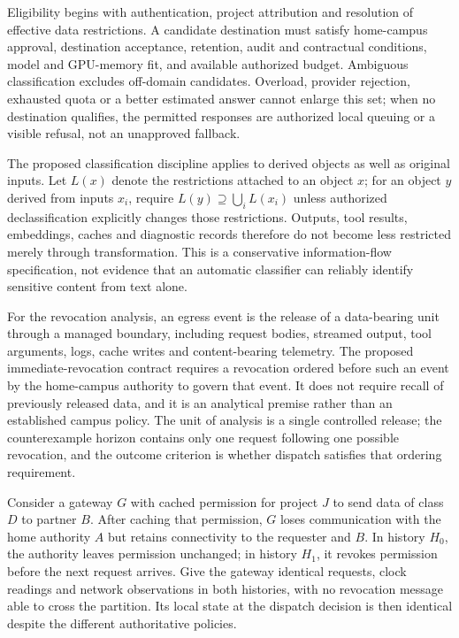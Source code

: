 \documentclass[11pt]{article}
\begin{document}
Eligibility begins with authentication, project attribution and resolution of effective data restrictions. A candidate destination must satisfy home-campus approval, destination acceptance, retention, audit and contractual conditions, model and GPU-memory fit, and available authorized budget. Ambiguous classification excludes off-domain candidates. Overload, provider rejection, exhausted quota or a better estimated answer cannot enlarge this set; when no destination qualifies, the permitted responses are authorized local queuing or a visible refusal, not an unapproved fallback.

The proposed classification discipline applies to derived objects as well as original inputs. Let $L(x)$ denote the restrictions attached to an object $x$; for an object $y$ derived from inputs $x_i$, require $L(y) \supseteq \bigcup_i L(x_i)$ unless authorized declassification explicitly changes those restrictions. Outputs, tool results, embeddings, caches and diagnostic records therefore do not become less restricted merely through transformation. This is a conservative information-flow specification, not evidence that an automatic classifier can reliably identify sensitive content from text alone.

For the revocation analysis, an egress event is the release of a data-bearing unit through a managed boundary, including request bodies, streamed output, tool arguments, logs, cache writes and content-bearing telemetry. The proposed immediate-revocation contract requires a revocation ordered before such an event by the home-campus authority to govern that event. It does not require recall of previously released data, and it is an analytical premise rather than an established campus policy. The unit of analysis is a single controlled release; the counterexample horizon contains only one request following one possible revocation, and the outcome criterion is whether dispatch satisfies that ordering requirement.

Consider a gateway $G$ with cached permission for project $J$ to send data of class $D$ to partner $B$. After caching that permission, $G$ loses communication with the home authority $A$ but retains connectivity to the requester and $B$. In history $H_0$, the authority leaves permission unchanged; in history $H_1$, it revokes permission before the next request arrives. Give the gateway identical requests, clock readings and network observations in both histories, with no revocation message able to cross the partition. Its local state at the dispatch decision is then identical despite the different authoritative policies.
\end{document}
